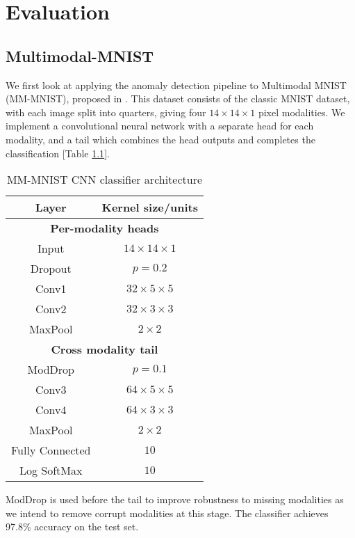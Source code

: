 \chapter{Evaluation}

\section{Multimodal-MNIST}
We first look at applying the anomaly detection pipeline to Multimodal MNIST (MM-MNIST), proposed in \cite{ModDrop}. This dataset consists of the classic MNIST dataset, with each image split into quarters, giving four $14\times 14 \times 1$ pixel modalities. We implement a convolutional neural network with a separate head for each modality, and a tail which combines the head outputs and completes the classification [Table \ref{table:mm-mnist}].

\begin{table}[ht]
    \caption{MM-MNIST CNN classifier architecture}
    \centering
    \begin{tabular}{c c}
    \\
    \hline\hline
    \textbf{Layer} & \textbf{Kernel size/units} \\ [0.5ex]
    \hline
    \multicolumn{2}{c}{\textbf{Per-modality heads}} \\
    \hline
    Input & $14\times 14\times 1$ \\
    Dropout & $p=0.2$ \\
    Conv1 & $32\times 5 \times 5$ \\
    Conv2 & $32\times 3 \times 3$ \\
    MaxPool & $2\times 2$\\
    \hline
    \multicolumn{2}{c}{\textbf{Cross modality tail}} \\
    \hline 
    ModDrop & $p=0.1$ \\
    Conv3 & $64 \times 5 \times 5$ \\
    Conv4 & $64 \times 3 \times 3$ \\
    MaxPool & $2 \times 2$ \\
    Fully Connected & $10$ \\
    Log SoftMax & $10$ \\ [1ex] 
    \hline
    \end{tabular}
    \label{table:mm-mnist}
\end{table}
    
ModDrop \cite{ModDrop} is used before the tail to improve robustness to missing modalities as we intend to remove corrupt modalities at this stage. The classifier achieves 97.8\% accuracy on the test set.\\

